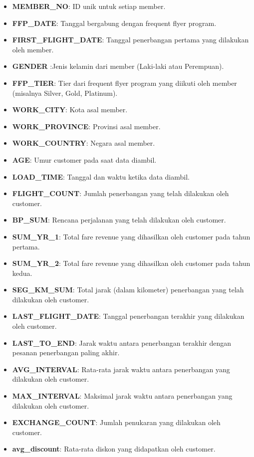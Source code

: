 \begin{itemize}
    \item \textbf{MEMBER\_NO}: ID unik untuk setiap member.
    \item \textbf{FFP\_DATE}: Tanggal bergabung dengan frequent flyer program.
    \item \textbf{FIRST\_FLIGHT\_DATE}: Tanggal penerbangan pertama yang dilakukan oleh member.
    \item \textbf{GENDER} :Jenis kelamin dari member (Laki-laki atau Perempuan).
    \item \textbf{FFP\_TIER}: Tier dari frequent flyer program yang diikuti oleh member (misalnya Silver, Gold, Platinum).
    \item \textbf{WORK\_CITY}: Kota asal member.
    \item \textbf{WORK\_PROVINCE}: Provinsi asal member.
    \item \textbf{WORK\_COUNTRY}: Negara asal member.
    \item \textbf{AGE}: Umur customer pada saat data diambil.
    \item \textbf{LOAD\_TIME}: Tanggal dan waktu ketika data diambil.
    \item \textbf{FLIGHT\_COUNT}: Jumlah penerbangan yang telah dilakukan oleh customer.
    \item \textbf{BP\_SUM}: Rencana perjalanan yang telah dilakukan oleh customer.
    \item \textbf{SUM\_YR\_1}: Total fare revenue yang dihasilkan oleh customer pada tahun pertama.
    \item \textbf{SUM\_YR\_2}: Total fare revenue yang dihasilkan oleh customer pada tahun kedua.
    \item \textbf{SEG\_KM\_SUM}: Total jarak (dalam kilometer) penerbangan yang telah dilakukan oleh customer.
    \item \textbf{LAST\_FLIGHT\_DATE}: Tanggal penerbangan terakhir yang dilakukan oleh customer.
    \item \textbf{LAST\_TO\_END}: Jarak waktu antara penerbangan terakhir dengan pesanan penerbangan paling akhir.
    \item \textbf{AVG\_INTERVAL}: Rata-rata jarak waktu antara penerbangan yang dilakukan oleh customer.
    \item \textbf{MAX\_INTERVAL}: Maksimal jarak waktu antara penerbangan yang dilakukan oleh customer.
    \item \textbf{EXCHANGE\_COUNT}: Jumlah penukaran yang dilakukan oleh customer.
    \item \textbf{avg\_discount}: Rata-rata diskon yang didapatkan oleh customer.

\end{itemize}
